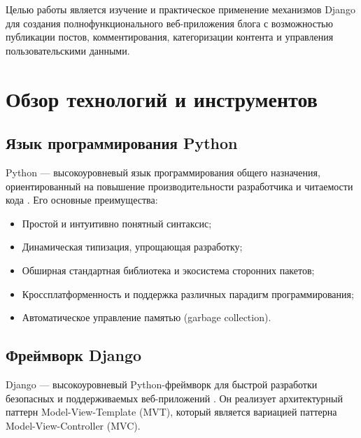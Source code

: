 \documentclass[pract,och,bachelor]{SCWorks}
\begin{document}
Целью работы является изучение и практическое применение механизмов Django для создания полнофункционального веб-приложения блога с возможностью публикации постов, комментирования, категоризации контента и управления пользовательскими данными.

\section{Обзор технологий и инструментов}

\subsection{Язык программирования Python}

Python --- высокоуровневый язык программирования общего назначения, ориентированный на повышение производительности разработчика и читаемости кода \cite{python}. Его основные преимущества:
\begin{itemize}
    \item Простой и интуитивно понятный синтаксис;
    \item Динамическая типизация, упрощающая разработку;
    \item Обширная стандартная библиотека и экосистема сторонних пакетов;
    \item Кроссплатформенность и поддержка различных парадигм программирования;
    \item Автоматическое управление памятью (garbage collection).
\end{itemize}

\subsection{Фреймворк Django}

Django --- высокоуровневый Python-фреймворк для быстрой разработки безопасных и поддерживаемых веб-приложений \cite{django}. Он реализует архитектурный паттерн Model-View-Template (MVT), который является вариацией паттерна Model-View-Controller (MVC).
\end{document}
